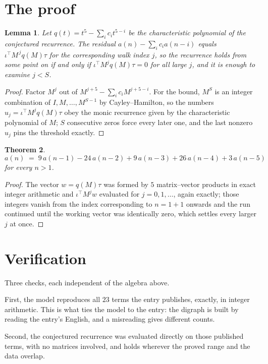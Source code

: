 \documentclass[11pt,a4paper]{article}
\theoremstyle{plain}
\newtheorem{theorem}{Theorem}
\newtheorem{lemma}[theorem]{Lemma}
\theoremstyle{definition}
\begin{document}
\section{The proof}

\begin{lemma}\label{lem:crit}
Let $q(t)=t^{5}-\sum_i c_it^{5-i}$ be the characteristic polynomial of the
conjectured recurrence. The residual $a(n)-\sum_ic_ia(n-i)$ equals
$\iota^{\!\top}M^{\,j}q(M)\tau$ for the corresponding walk index $j$, so the recurrence
holds from some point on if and only if $\iota^{\!\top}M^{j}q(M)\tau=0$ for all large $j$,
and it is enough to examine $j<S$.
\end{lemma}

\begin{proof}
Factor $M^{j}$ out of $M^{j+5}-\sum_ic_iM^{j+5-i}$. For the bound, $M^{S}$
is an integer combination of $I,M,\dots,M^{S-1}$ by Cayley--Hamilton, so the numbers
$u_j=\iota^{\!\top}M^{j}q(M)\tau$ obey the monic recurrence given by the characteristic
polynomial of $M$; $S$ consecutive zeros force every later one, and the last nonzero $u_j$
pins the threshold exactly.
\end{proof}

\begin{theorem}
\[
a(n)\;=\;9\,a(n-1) - 24\,a(n-2) + 9\,a(n-3) + 26\,a(n-4) + 3\,a(n-5)
\]
for every $n>1$.
\end{theorem}

\begin{proof}
The vector $w=q(M)\tau$ was formed by $5$ matrix--vector products in exact integer
arithmetic and $\iota^{\!\top}M^{j}w$ evaluated for $j=0,1,\dots$, again exactly; those
integers vanish from the index corresponding to $n=1+1$ onwards and the run continued
until the working vector was identically zero, which settles every larger $j$ at once.
\end{proof}

\section{Verification}

Three checks, each independent of the algebra above.

First, the model reproduces all $23$ terms the entry publishes, exactly, in integer
arithmetic. This is what ties the model to the entry: the digraph is built by reading the
entry's English, and a misreading gives different counts.

Second, the conjectured recurrence was evaluated directly on those published terms, with no
matrices involved, and holds wherever the proved range and the data overlap.
\end{document}
